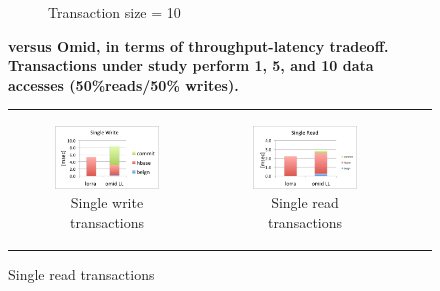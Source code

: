 \begin{figure}
\begin{subfigure}[t]{0.33\textwidth}
	\caption[]{Transaction size = 10}
    \label{fig:tl-10}
  \end{subfigure}			
  \caption{\bf{{\sys} versus Omid, in terms of throughput-latency tradeoff. Transactions under study 
perform 1, 5, and 10 data accesses (50\%reads/50\% writes).  }}
  \label{fig:throughput-latency}
\end{figure}



\begin{figure}[]
  \centering
  \begin{tabular}{cccc}
    
  \begin{subfigure}[t]{0.4\textwidth}
	\includegraphics[width=\textwidth]{figs/singlewrite.pdf}
	\caption[]{Single write transactions}
    \label{fig:latency:lorra1write}
  \end{subfigure} &

  \begin{subfigure}[t]{0.4\textwidth}
	\includegraphics[width=\textwidth]{figs/singleread.pdf}
	\caption[]{Single read transactions}
    \label{fig:latency:lorra1read}
  \end{subfigure} \\


\end{tabular}
\end{figure}

